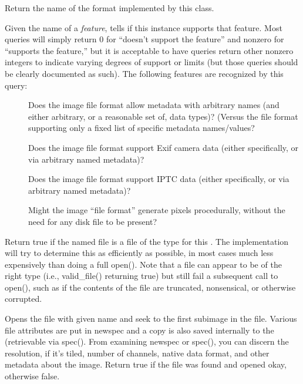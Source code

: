 Return the name of the format implemented by this class.
\apiend

\label{sec:inputsupportsfeaturelist}
Given the name of a \emph{feature}, tells if this \ImageInput  instance
supports that feature. Most queries will simply return 0 for ``doesn't
support the feature'' and nonzero for ``supports the feature,'' but it is
acceptable to have queries return other nonzero integers to indicate varying
degrees of support or limits (but those queries should be clearly documented
as such). The following features are recognized by this query:
\begin{description}
\item[\spc] \spc
\item[\rm {}] Does the image file format allow
  metadata with arbitrary names (and either arbitrary, or a reasonable set
  of, data types)? (Versus the file format supporting only a fixed list of
  specific metadata names/values?
\item[\rm {}] Does the image file format support Exif camera data
  (either specifically, or via arbitrary named metadata)?
\item[\rm {}] Does the image file format support IPTC data
  (either specifically, or via arbitrary named metadata)?
\item[\rm {}] Might the image ``file format'' generate pixels
  procedurally, without the need for any disk file to be present?
  \end{description}
\apiend

Return {\cf true} if the named file is a file of the type for this
\ImageInput.  The implementation will try to determine this as
efficiently as possible, in most cases much less expensively than doing
a full {\cf open()}.  Note that a file can appear to be of
the right type (i.e., {\cf valid_file()} returning {\cf true}) but still
fail a subsequent call to {\cf open()}, such as if the contents of the
file are truncated, nonsensical, or otherwise corrupted.
\apiend

Opens the file with given name and seek to the first subimage in the
file.  Various file attributes are put in
{\kw newspec} and a copy is also saved internally to the
\ImageInput (retrievable via {\kw spec()}.  From examining
{\kw newspec} or {\kw spec()}, you can discern the resolution, if it's
tiled, number of channels, native data format, and other metadata about
the image.  Return {\kw true} if the file was found and opened okay,
otherwise {\kw false}.
\apiend

